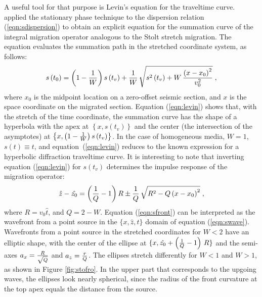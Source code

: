 A useful tool for that purpose is Levin's equation for the traveltime
curve.  \cite{Levin.sep.42.373} applied the stationary
phase technique to the dispersion relation (\ref{eqn:sdispersion}) to
obtain an explicit equation for the summation curve of the integral
migration operator analogous to the Stolt stretch migration. The
equation evaluates the summation path in the stretched coordinate
system, as follows:
\begin{equation}
s\left(t_0\right)=
\left(1-{1\over W}\right) s\left(t_v\right)+
{1\over W}\,
\sqrt{s^2\left(t_v\right) + {W\,
 {{\left(x-x_0\right)^2} \over v_0^2}}}\;,
\label{eqn:levin} 
\end{equation}
where $x_0$ is the midpoint location on a zero-offset seismic section,
and $x$ is the space coordinate on the migrated section.  Equation
(\ref{eqn:levin}) shows that, with the stretch of the time coordinate,
the summation curve has the shape of a hyperbola with the apex at
$\left\{x,s\left(t_v\right)\right\}$ and the center (the intersection
of the asymptotes) at $\left\{x,{\left(1-{1\over
        W}\right)}\,s\left(t_v\right)\right\}$. In the case of
homogeneous media, $W=1$, $s(t)\equiv t$, and
equation~(\ref{eqn:levin}) reduces to the known expression for a
hyperbolic diffraction traveltime curve. It is interesting to note
that inverting equation (\ref{eqn:levin}) for $s\left(t_v\right)$
determines the impulse response of the migration operator:
\begin{equation}
\hat{z}-\hat{z_0}=
\left({1\over Q}-1\right) R \pm
{1\over Q}\,
\sqrt{R^2 - 
{Q\,{\left(x-x_0\right)^2}}}\;,
\label{eqn:sfront} 
\end{equation}
where $R=v_0 \hat{t}$, and $Q=2-W$. Equation (\ref{eqn:sfront}) can be
interpreted as the wavefront from a point source in the
$\{x,\hat{z},\hat{t}\}$ domain of equation (\ref{eqn:swave}).
Wavefronts from a point source in the stretched coordinates for $W<2$
have an elliptic shape, with the center of the ellipse at
$\{x,\hat{z_0}+\left( {1 \over Q}-1\right)\, R \}$ and the semi-axes
$a_x={R \over \sqrt{Q}}$ and $a_z={r \over Q}$. The ellipses stretch
differently for $W<1$ and $W>1$, as shown in Figure \ref{fig:stofro}.
In the upper part that corresponds to the upgoing waves, the ellipses
look nearly spherical, since the radius of the front curvature at the
top apex equals the distance from the source.


